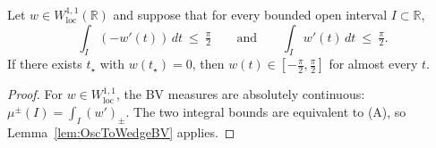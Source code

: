 \begin{corollary}\label{cor:OscToWedgeAC}
Let $w\in W^{1,1}_{\mathrm{loc}}(\mathbb{R})$ and suppose that for every bounded open interval $I\subset\mathbb{R}$,
\[ \int_I (-w'(t))\,dt\ \le\ \tfrac{\pi}{2}\qquad\text{and}\qquad \int_I w'(t)\,dt\ \le\ \tfrac{\pi}{2}. \]
If there exists $t_\star$ with $w(t_\star)=0$, then $w(t)\in[-\tfrac{\pi}{2},\tfrac{\pi}{2}]$ for almost every $t$.
\end{corollary}

\begin{proof}
For $w\in W^{1,1}_{\mathrm{loc}}$, the BV measures are absolutely continuous: $\mu^\pm(I)=\int_I (w')_\pm$. The two integral bounds are equivalent to (A), so Lemma~\ref{lem:OscToWedgeBV} applies.
\end{proof}

